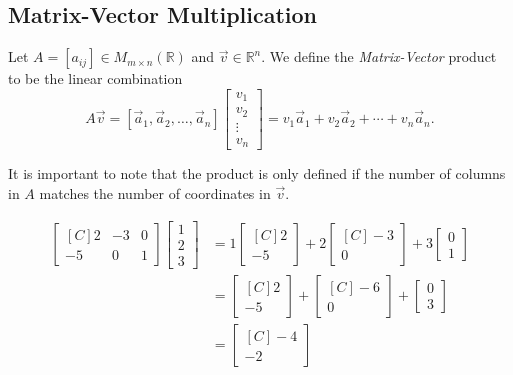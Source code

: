 \subsection{Matrix-Vector Multiplication}

\begin{definition}
Let $A=[a_{ij}]\in M_{m\times n}(\mathbb{R})$ and $\vec{v} \in \mathbb{R}^n$.  
We define the \emph{Matrix-Vector} product to be the linear combination 
\[
A\vec{v}=[\vec{a}_1, \vec{a}_2, \ldots ,\vec{a}_n]\begin{bmatrix}v_1 \\ v_2 \\ 
\vdots \\ v_n \end{bmatrix}=v_1\vec{a}_1+v_2\vec{a}_2+\cdots+v_n\vec{a}_n.
\]
\end{definition} 
\begin{remark}
It is important to note that the product is only defined if the number of columns in $A$ matches the number of coordinates in $\vec{v}$.
\end{remark}

\begin{example}\label{ex:mv_mult_by_def}
\begin{align*}
\begin{bmatrix*}[C]
2 & -3 & 0 \\
-5 & 0 & 1 
\end{bmatrix*} 
\begin{bmatrix}1\\ 2 \\ 3 \end{bmatrix}
&=1\begin{bmatrix*}[C]2\\-5\end{bmatrix*} 
+2\begin{bmatrix*}[C]-3\\0\end{bmatrix*} 
+3\begin{bmatrix}0\\1\end{bmatrix}\\
&=\begin{bmatrix*}[C]2\\-5\end{bmatrix*}
+\begin{bmatrix*}[C]-6\\0\end{bmatrix*}+\begin{bmatrix}0\\3\end{bmatrix}\\
&=\begin{bmatrix*}[C]-4\\-2\end{bmatrix*}
\end{align*}
\end{example}

